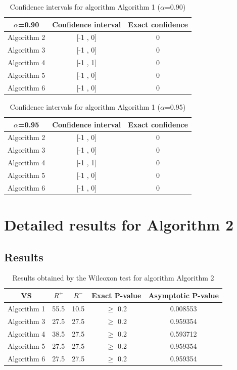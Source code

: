 \documentclass[a4paper,10pt]{article}
\begin{document}
\begin{table}[!htp]
\centering\small
\begin{tabular}{
|c|c|c|}
\hline
 $\alpha$=0.90 & Confidence interval & Exact confidence \\ \hline 
Algorithm 2 & [-1 , 0] & 0\\ \hline 
Algorithm 3 & [-1 , 0] & 0\\ \hline 
Algorithm 4 & [-1 , 1] & 0\\ \hline 
Algorithm 5 & [-1 , 0] & 0\\ \hline 
Algorithm 6 & [-1 , 0] & 0\\ \hline 

\end{tabular}
\caption{Confidence intervals for algorithm Algorithm 1 ($\alpha$=0.90)}
\end{table}
\begin{table}[!htp]
\centering\small
\begin{tabular}{
|c|c|c|}
\hline
 $\alpha$=0.95 & Confidence interval & Exact confidence \\ \hline 
Algorithm 2 & [-1 , 0] & 0\\ \hline 
Algorithm 3 & [-1 , 0] & 0\\ \hline 
Algorithm 4 & [-1 , 1] & 0\\ \hline 
Algorithm 5 & [-1 , 0] & 0\\ \hline 
Algorithm 6 & [-1 , 0] & 0\\ \hline 

\end{tabular}
\caption{Confidence intervals for algorithm Algorithm 1 ($\alpha$=0.95)}
\end{table}

 \clearpage 


\section{Detailed results for Algorithm 2}


\subsection{Results}

\begin{table}[!htp]
\centering\small
\begin{tabular}{
|c|c|c|c|c|}
\hline
 VS & $R^{+}$ & $R^{-}$ & Exact P-value & Asymptotic P-value \\ \hline 
Algorithm 1 & 55.5 & 10.5 & $\geq$ 0.2 & 0.008553\\ \hline 
Algorithm 3 & 27.5 & 27.5 & $\geq$ 0.2 & 0.959354\\ \hline 
Algorithm 4 & 38.5 & 27.5 & $\geq$ 0.2 & 0.593712\\ \hline 
Algorithm 5 & 27.5 & 27.5 & $\geq$ 0.2 & 0.959354\\ \hline 
Algorithm 6 & 27.5 & 27.5 & $\geq$ 0.2 & 0.959354\\ \hline 

\end{tabular}
\caption{Results obtained by the Wilcoxon test for algorithm Algorithm 2}
\end{table}
\end{document}
